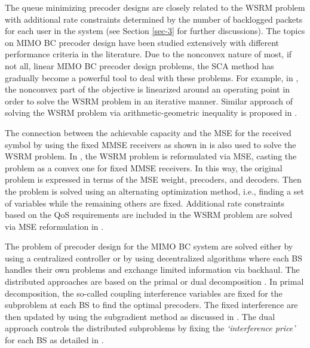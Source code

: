 The queue minimizing precoder designs are closely related to the \ac{WSRM} problem with additional rate constraints determined by the number of backlogged packets for each user in the system (see Section \ref{sec-3} for further discussions). The topics on \ac{MIMO} \ac{BC} precoder design have been studied extensively with different performance criteria in the literature. Due to the nonconvex nature of most, if not all, linear \ac{MIMO} \ac{BC} precoder design problems, the \ac{SCA} method has gradually become a powerful tool to deal with these problems. For example, in \cite{sin_algorithm}, the nonconvex part of the objective is linearized around an operating point in order to solve the \ac{WSRM} problem in an iterative manner. Similar approach of solving the \ac{WSRM} problem via arithmetic-geometric inequality is proposed in \cite{tran2012fast}.

The connection between the achievable capacity and the \ac{MSE} for the received symbol by using the fixed \ac{MMSE} receivers as shown in \cite{viswanath1999optimal,mse_duality} is also used to solve the \ac{WSRM} problem. In \cite{christensen2008weighted,wmmse_shi}, the \ac{WSRM} problem is reformulated via \ac{MSE}, casting the problem as a convex one for fixed \ac{MMSE} receivers. In this way, the original problem is expressed in terms of the \ac{MSE} weight, precoders, and decoders. Then the problem is solved using an alternating optimization method, i.e., finding a set of variables while the remaining others are fixed. Additional rate constraints based on the \ac{QoS} requirements are included in the \ac{WSRM} problem are solved via \ac{MSE} reformulation in \cite{kaleva2013primal}.

The problem of precoder design for the \ac{MIMO} \ac{BC} system are solved either by using a centralized controller or by using decentralized algorithms where each BS handles their own problems and exchange limited information via backhaul. The distributed approaches are based on the primal or dual decomposition \cite{palomar2006tutorial,boyd2011distributed}. In primal decomposition, the so-called coupling interference variables are fixed for the subproblem at each \ac{BS} to find the optimal precoders. The fixed interference are then updated by using the subgradient method as discussed in \cite{pennanen2011decentralized}. The dual approach controls the distributed subproblems by fixing the \emph{`interference price'} for each \ac{BS} as detailed in \cite{tolli2011decentralized}.

